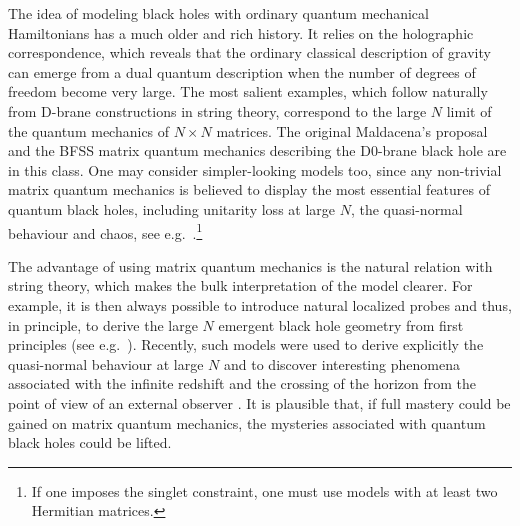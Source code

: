 \documentclass[12pt]{article}
\numberwithin{equation}{section}
\begin{document}
The idea of modeling black holes with ordinary quantum mechanical Hamiltonians has a much older and rich history. It relies on the holographic correspondence, which reveals that the ordinary classical description of gravity can emerge from a dual quantum description when the number of degrees of freedom become very large. The most salient examples, which follow naturally from D-brane constructions in string theory, correspond to the large $N$ limit of the quantum mechanics of $N\times N$ matrices. The original Maldacena's proposal \cite{malda} and the BFSS matrix quantum mechanics describing the D0-brane black hole \cite{D0BH} are in this class. One may consider simpler-looking models too, since any non-trivial matrix quantum mechanics is believed to display the most essential features of quantum black holes, including unitarity loss at large $N$, the quasi-normal behaviour and chaos, see e.g.\ \cite{miscrefsBH}.\footnote{If one imposes the singlet constraint, one must use models with at least two Hermitian matrices.}

The advantage of using matrix quantum mechanics is the natural relation with string theory, which makes the bulk interpretation of the model clearer. For example, it is then always possible to introduce natural localized probes and thus, in principle, to derive the large $N$ emergent black hole geometry from first principles (see e.g.\ \cite{fer1,bere}). Recently, such models were used to derive explicitly the quasi-normal behaviour at large $N$ \cite{IP} and to discover interesting phenomena associated with the infinite redshift and the crossing of the horizon from the point of view of an external observer \cite{fer2}. It is plausible that, if full mastery could be gained on matrix quantum mechanics, the  mysteries associated with quantum black holes could be lifted.
\end{document}
